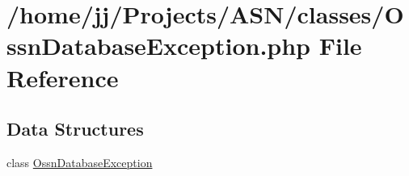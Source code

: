 \hypertarget{_ossn_database_exception_8php}{}\section{/home/jj/\+Projects/\+A\+S\+N/classes/\+Ossn\+Database\+Exception.php File Reference}
\label{_ossn_database_exception_8php}
\subsection*{Data Structures}
\begin{DoxyCompactItemize}
\item 
class \hyperlink{class_ossn_database_exception}{Ossn\+Database\+Exception}
\end{DoxyCompactItemize}
